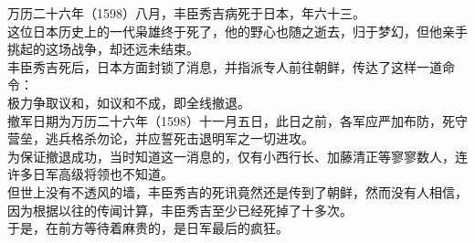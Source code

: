 \begin{multicols}{\theparacolNo}
万历二十六年（1598）八月，丰臣秀吉病死于日本，年六十三。\\

这位日本历史上的一代枭雄终于死了，他的野心也随之逝去，归于梦幻，但他亲手挑起的这场战争，却还远未结束。\\

丰臣秀吉死后，日本方面封锁了消息，并指派专人前往朝鲜，传达了这样一道命令：\\

极力争取议和，如议和不成，即全线撤退。\\

撤军日期为万历二十六年（1598）十一月五日，此日之前，各军应严加布防，死守营垒，逃兵格杀勿论，并应誓死击退明军之一切进攻。\\

为保证撤退成功，当时知道这一消息的，仅有小西行长、加藤清正等寥寥数人，连许多日军高级将领也不知道。\\

但世上没有不透风的墙，丰臣秀吉的死讯竟然还是传到了朝鲜，然而没有人相信，因为根据以往的传闻计算，丰臣秀吉至少已经死掉了十多次。\\

于是，在前方等待着麻贵的，是日军最后的疯狂。\\

\ifnum{}
	\end{multicols}
\fi
\newpage


